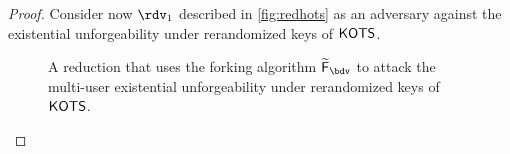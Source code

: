 \begin{proof}
  Consider now $\rdv_1$ described in \autoref{fig:redhots} as an adversary against the existential unforgeability under rerandomized keys of $\mathsf{KOTS}$.
  \begin{figure}\centering
  \caption{A reduction that uses the forking algorithm $\widetilde\fork_\bdv$ to attack the multi-user existential unforgeability under rerandomized keys of $\mathsf{KOTS}$.}\label{fig:redhots}

\end{figure}
\end{proof}
